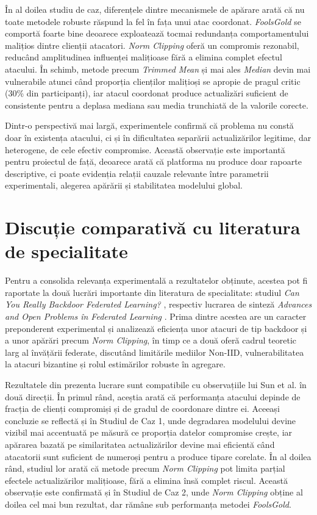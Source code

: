 \documentclass[../../main.tex]{subfiles}
\begin{document}
        În al doilea studiu de caz, diferențele dintre mecanismele de apărare arată că nu toate metodele robuste răspund la fel în fața unui atac coordonat. \textit{FoolsGold} se comportă foarte bine deoarece exploatează tocmai redundanța comportamentului malițios dintre clienții atacatori. \textit{Norm Clipping} oferă un compromis rezonabil, reducând amplitudinea influenței malițioase fără a elimina complet efectul atacului. În schimb, metode precum \textit{Trimmed Mean} și mai ales \textit{Median} devin mai vulnerabile atunci când proporția clienților malițioși se apropie de pragul critic (30\% din participanți), iar atacul coordonat produce actualizări suficient de consistente pentru a deplasa mediana sau media trunchiată de la valorile corecte.

        Dintr-o perspectivă mai largă, experimentele confirmă că problema nu constă doar în existența atacului, ci și în dificultatea separării actualizărilor legitime, dar heterogene, de cele efectiv compromise. Această observație este importantă pentru proiectul de față, deoarece arată că platforma nu produce doar rapoarte descriptive, ci poate evidenția relații cauzale relevante între parametrii experimentali, alegerea apărării și stabilitatea modelului global.

    \section{Discuție comparativă cu literatura de specialitate}

        Pentru a consolida relevanța experimentală a rezultatelor obținute, acestea pot fi raportate la două lucrări importante din literatura de specialitate: studiul \textit{Can You Really Backdoor Federated Learning?} \cite{sun2019backdoor}, respectiv lucrarea de sinteză \textit{Advances and Open Problems în Federated Learning} \cite{kairouz2021federated}. Prima dintre acestea are un caracter preponderent experimental și analizează eficiența unor atacuri de tip backdoor și a unor apărări precum \textit{Norm Clipping}, în timp ce a două oferă cadrul teoretic larg al învățării federate, discutând limitările mediilor Non-IID, vulnerabilitatea la atacuri bizantine și rolul estimărilor robuste în agregare.

        Rezultatele din prezenta lucrare sunt compatibile cu observațiile lui Sun et al. \cite{sun2019backdoor} în două direcții. În primul rând, aceștia arată că performanța atacului depinde de fracția de clienți compromiși și de gradul de coordonare dintre ei. Aceeași concluzie se reflectă și în Studiul de Caz 1, unde degradarea modelului devine vizibil mai accentuată pe măsură ce proporția datelor compromise crește, iar apărarea bazată pe similaritatea actualizărilor devine mai eficientă când atacatorii sunt suficient de numeroși pentru a produce tipare corelate. În al doilea rând, studiul lor arată că metode precum \textit{Norm Clipping} pot limita parțial efectele actualizărilor malițioase, fără a elimina însă complet riscul. Această observație este confirmată și în Studiul de Caz 2, unde \textit{Norm Clipping} obține al doilea cel mai bun rezultat, dar rămâne sub performanța metodei \textit{FoolsGold}.
\end{document}
